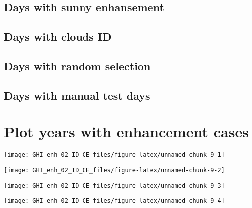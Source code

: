 \documentclass[
  10pt,
  a4paper,oneside]{article}
\begin{document}
\FloatBarrier

\hypertarget{days-with-sunny-enhansement}{%
\subsection{Days with sunny enhansement}\label{days-with-sunny-enhansement}}

\FloatBarrier

\hypertarget{days-with-clouds-id}{%
\subsection{Days with clouds ID}\label{days-with-clouds-id}}

\FloatBarrier

\hypertarget{days-with-random-selection}{%
\subsection{Days with random selection}\label{days-with-random-selection}}

\FloatBarrier

\hypertarget{days-with-manual-test-days}{%
\subsection{Days with manual test days}\label{days-with-manual-test-days}}

\newpage
\FloatBarrier

\hypertarget{plot-years-with-enhancement-cases}{%
\section{Plot years with enhancement cases}\label{plot-years-with-enhancement-cases}}

\begin{center}\texttt{[image: GHI\_enh\_02\_ID\_CE\_files/figure-latex/unnamed-chunk-9-1]} \end{center}

\begin{center}\texttt{[image: GHI\_enh\_02\_ID\_CE\_files/figure-latex/unnamed-chunk-9-2]} \end{center}

\begin{center}\texttt{[image: GHI\_enh\_02\_ID\_CE\_files/figure-latex/unnamed-chunk-9-3]} \end{center}

\begin{center}\texttt{[image: GHI\_enh\_02\_ID\_CE\_files/figure-latex/unnamed-chunk-9-4]} \end{center}
\end{document}
